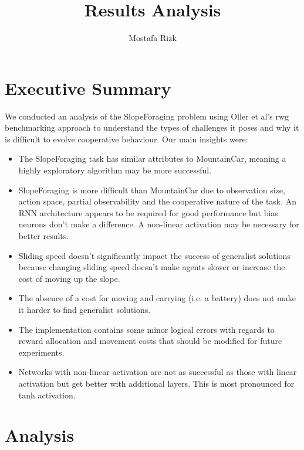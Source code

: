 \documentclass[12pt]{article}
\title{Results Analysis}
\author{Mostafa Rizk}
\begin{document}
\maketitle
\tableofcontents

\section{Executive Summary}

We conducted an analysis of the SlopeForaging problem using Oller et al's rwg benchmarking approach to understand the types of challenges it poses and why it is difficult to evolve cooperative behaviour. Our main insights were:

\begin{itemize}
\item The SlopeForaging task has similar attributes to MountainCar, meaning a highly exploratory algorithm may be more successful.

\item SlopeForaging is more difficult than MountainCar due to observation size, action space, partial observability and the cooperative nature of the task. An RNN architecture appears to be required for good performance but bias neurons don't make a difference. A non-linear activation may be necessary for better results.

\item Sliding speed doesn't significantly impact the success of generalist solutions because changing sliding speed doesn't make agents slower or increase the cost of moving up the slope.

\item The absence of a cost for moving and carrying (i.e. a battery) does not make it harder to find generalist solutions.

\item The implementation contains some minor logical errors with regards to reward allocation and movement costs that should be modified for future experiments.

\item Networks with non-linear activation are not as successful as those with linear activation but get better with additional layers. This is most pronounced for tanh activation.

\end{itemize}

\section{Analysis}
		
\end{document}

